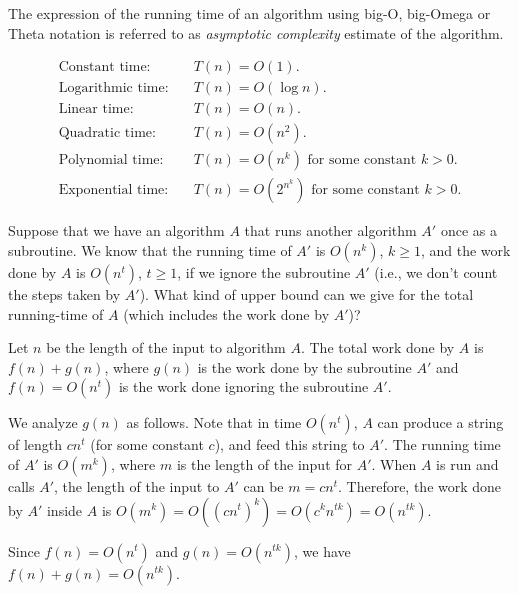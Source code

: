 \begin{note} \label{note:Asymptotic-complexity}
The expression of the running time of an algorithm using big-O, big-Omega or Theta notation is referred to as \emph{asymptotic complexity}  estimate of the algorithm.
\end{note}


\begin{definition} \label{definition:Names-for-common-growth-rates} 
\begin{align*}
\text{Constant time:} & \quad T(n) = O(1). \\
\text{Logarithmic time:} & \quad T(n) = O(\log n). \\
\text{Linear time:} & \quad T(n) = O(n). \\
\text{Quadratic time:} &  \quad T(n) = O(n^2). \\
\text{Polynomial time:} & \quad T(n) = O(n^k) \text{ for some constant $k > 0$}. \\
\text{Exponential time:} & \quad T(n) = O(2^{n^k}) \text{ for some constant $k > 0$}.
\end{align*}
\end{definition}


\begin{flex}
\begin{exercise}  \label{exercise:Composing-polynomial-time-algorithms}
Suppose that we have an algorithm $A$ that runs another algorithm $A'$ once as a subroutine. We know that the running time of $A'$ is $O(n^k)$, $k \geq 1$, and the work done by $A$ is $O(n^t)$, $t \geq 1$, if we ignore the subroutine $A'$ (i.e., we don't count the steps taken by $A'$). What kind of upper bound can we give for the total running-time of $A$ (which includes the work done by $A'$)?
\end{exercise}

\begin{solution}
Let $n$ be the length of the input to algorithm $A$. The total work done by $A$ is $f(n) + g(n)$, where $g(n)$ is the work done by the subroutine $A'$ and $f(n) = O(n^t)$ is the work done ignoring the subroutine $A'$. 

We analyze $g(n)$ as follows. Note that in time $O(n^t)$, $A$ can produce a string of length $cn^t$ (for some constant $c$), and feed this string to $A'$. The running time of $A'$ is $O(m^k)$, where $m$ is the length of the input for $A'$. When $A$ is run and calls $A'$, the length of the input to $A'$ can be $m = cn^t$. Therefore, the work done by $A'$ inside $A$ is $O(m^k) = O((cn^t)^k) = O(c^k n^{tk}) = O(n^{tk})$.

Since $f(n) = O(n^t)$ and $g(n) = O(n^{tk})$, we have $f(n) + g(n) = O(n^{tk})$. 
\end{solution}
\end{flex}


